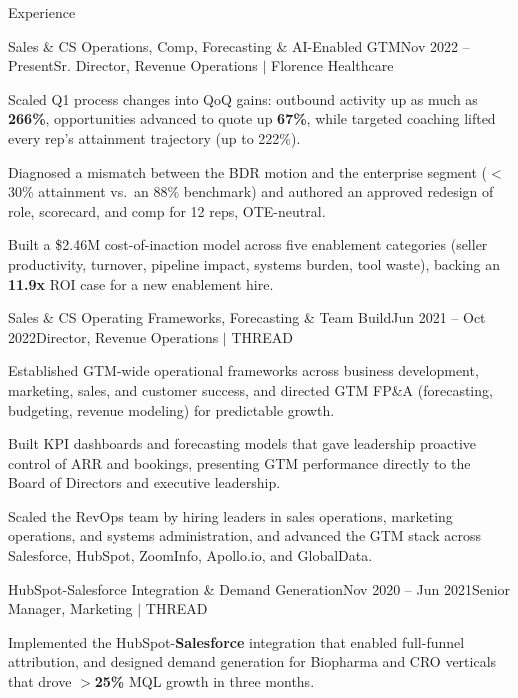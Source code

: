 \documentclass{resume}
\begin{document}
\begin{rSection}{Experience}
\begin{rSubsection}{Sales \& CS Operations, Comp, Forecasting \& AI-Enabled GTM}{\textcolor{black!60}{Nov 2022 -- Present}}{Sr. Director, Revenue Operations $\vert$ Florence Healthcare}{}
\item Scaled Q1 process changes into QoQ gains: outbound activity up as much as \textbf{266\%}, opportunities advanced to quote up \textbf{67\%}, while targeted coaching lifted every rep's attainment trajectory (up to 222\%).
\item Diagnosed a mismatch between the BDR motion and the enterprise segment ($<$30\% attainment vs.\ an 88\% benchmark) and authored an approved redesign of role, scorecard, and comp for 12 reps, OTE-neutral.
\item Built a \$2.46M cost-of-inaction model across five enablement categories (seller productivity, turnover, pipeline impact, systems burden, tool waste), backing an \textbf{11.9x} ROI case for a new enablement hire.
\end{rSubsection}

\begin{rSubsection}{Sales \& CS Operating Frameworks, Forecasting \& Team Build}{\textcolor{black!60}{Jun 2021 -- Oct 2022}}{Director, Revenue Operations $\vert$ THREAD}{}
\item Established GTM-wide operational frameworks across business development, marketing, sales, and customer success, and directed GTM FP\&A (forecasting, budgeting, revenue modeling) for predictable growth.
\item Built KPI dashboards and forecasting models that gave leadership proactive control of ARR and bookings, presenting GTM performance directly to the Board of Directors and executive leadership.
\item Scaled the RevOps team by hiring leaders in sales operations, marketing operations, and systems administration, and advanced the GTM stack across Salesforce, HubSpot, ZoomInfo, Apollo.io, and GlobalData.
\end{rSubsection}

\begin{rSubsection}{HubSpot-Salesforce Integration \& Demand Generation}{\textcolor{black!60}{Nov 2020 -- Jun 2021}}{Senior Manager, Marketing $\vert$ THREAD}{}
\item Implemented the HubSpot-\textbf{Salesforce} integration that enabled full-funnel attribution, and designed demand generation for Biopharma and CRO verticals that drove $>$\textbf{25\%} MQL growth in three months.
\end{rSubsection}


\end{rSection}
\end{document}

